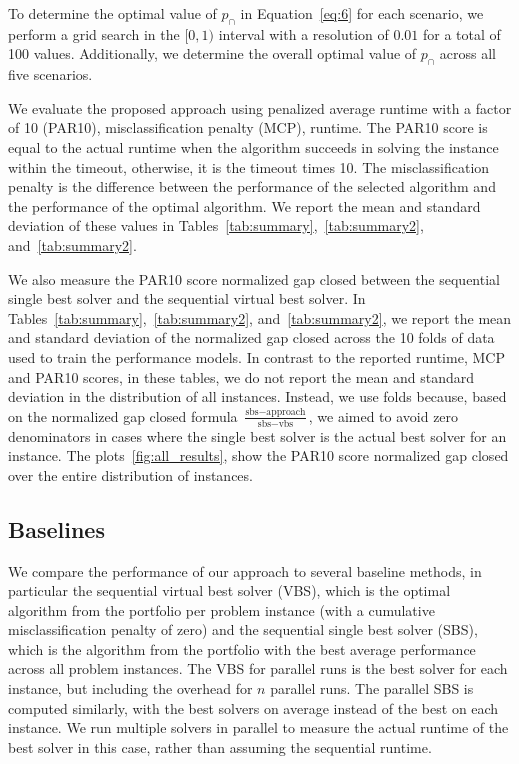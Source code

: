 To determine the optimal value of $p_{\cap}$ in Equation~\ref{eq:6} for each scenario, we perform a grid search in the $[0, 1)$ interval with a resolution of $0.01$ for a total of 100 values. Additionally, we determine the overall optimal value of $p_{\cap}$ across all five scenarios.

We evaluate the proposed approach using penalized average runtime with a factor of 10 (PAR10), misclassification penalty (MCP), runtime. The PAR10 score is equal to the actual runtime when the algorithm succeeds in solving the instance within the timeout, otherwise, it is the timeout times 10. The misclassification penalty is the difference between the performance of the selected algorithm and the performance of the optimal algorithm. We report the mean and standard deviation of these values in Tables~\ref{tab:summary},~\ref{tab:summary2}, and~\ref{tab:summary2}. 

We also measure the PAR10 score normalized gap closed between the sequential single best solver and the sequential virtual best solver. In Tables~\ref{tab:summary},~\ref{tab:summary2}, and~\ref{tab:summary2}, we report the mean and standard deviation of the normalized gap closed across the 10 folds of data used to train the performance models. In contrast to the reported runtime, MCP and PAR10 scores, in these tables, we do not report the mean and standard deviation in the distribution of all instances. Instead, we use folds because, based on the normalized gap closed formula $\frac{\text{sbs} - \text{approach}}{\text{sbs} - \text{vbs}}$, we aimed to avoid zero denominators in cases where the single best solver is the actual best solver for an instance. The plots~\ref{fig:all_results}, show the PAR10 score normalized gap closed over the entire distribution of instances.


\subsection{Baselines}

We compare the performance of our approach to several baseline methods, in particular the sequential virtual best solver (VBS), which is the optimal algorithm from the portfolio per problem instance (with a cumulative misclassification penalty of zero) and the sequential single best solver (SBS), which is the algorithm from the portfolio with the best average performance across all problem instances. The VBS for parallel runs is the best solver for each instance, but including the overhead for $n$ parallel runs. The parallel SBS is computed similarly, with the best solvers on average instead of the best on each instance. We run multiple solvers in parallel to measure the actual runtime of the best solver in this case, rather than assuming the sequential runtime.

